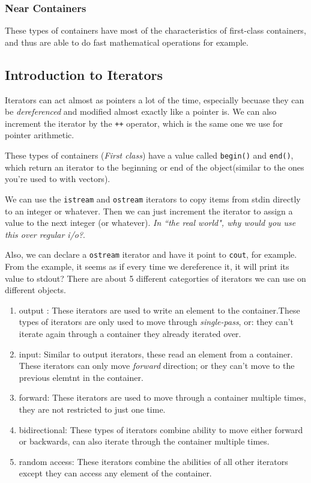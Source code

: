 \documentclass{article}
\begin{document}
\subsubsection{Near Containers}
These types of containers have most of the characteristics of first-class containers, and thus are able to do fast 
mathematical operations for example.
\subsection{Introduction to Iterators}
Iterators can act almost as pointers a lot of the time, especially becuase they can be \textit{dereferenced} and 
modified almost exactly like a pointer is. We can also increment the iterator by the \texttt{++} operator, which is
the same one we use for pointer arithmetic.

These types of containers (\textit{First class}) have a value called \texttt{begin()} and \texttt{end()}, which return
an iterator to the beginning or end of the object(similar to the ones you're used to with vectors).

We can use the \texttt{istream} and \texttt{ostream} iterators to copy items from stdin directly to an integer or whatever.
Then we can just increment the iterator to assign a value to the next integer (or whatever). \textit{In ``the real world", why
would you use this over regular i/o?}.

Also, we can declare a \texttt{ostream} iterator and have it point to \texttt{cout}, for example. From the example, it seems
as if every time we dereference it, it will print its value to stdout? 
There are about 5 different categorties of iterators we can use on different objects. 
\begin{enumerate}
		\item{output }: These iterators are used to write an element to the container.These types of iterators are only used
				to move through \textit{single-pass}, or: they can't iterate again through a container they already iterated
				over.
		\item{input}: Similar to output iterators, these read an element from a container. These iterators can only move 
				\textit{forward} direction; or they can't move to the previous elemtnt in the container.
		\item{forward}: These iterators are used to move through a container multiple times, they are not restricted to just
				one time.
		\item{bidirectional}: These types of iterators combine ability to move either forward or backwards, can also iterate
				through the container multiple times.
		\item{random access}: These iterators combine the abilities of all other iterators except they can access any element 
				of the container.
\end{enumerate}
\end{document}
